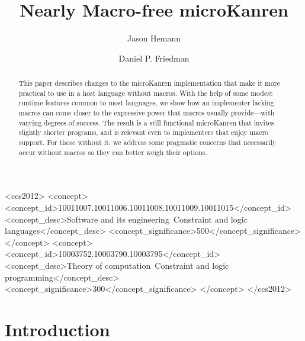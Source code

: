 \documentclass[sigplan,balance,pbalance,natbib=false]{acmart}
\begin{document}
\title{Nearly Macro-free microKanren}

\author{Jason Hemann}
\author{Daniel P. Friedman}

\renewcommand{\shortauthors}{Hemann et al.}

\begin{abstract}

  This paper describes changes to the microKanren implementation that
  make it more practical to use in a host language without macros.
  With the help of some modest runtime features common to most
  languages, we show how an implementer lacking macros can come closer
  to the expressive power that macros usually provide---with varying
  degrees of success. The result is a still functional microKanren
  that invites slightly shorter programs, and is relevant even to
  implementers that enjoy macro support. For those without it, we
  address some pragmatic concerns that necessarily occur without
  macros so they can better weigh their options.

\end{abstract}

\begin{CCSXML}
<ccs2012>
   <concept>
       <concept_id>10011007.10011006.10011008.10011009.10011015</concept_id>
       <concept_desc>Software and its engineering~Constraint and logic languages</concept_desc>
       <concept_significance>500</concept_significance>
   </concept>
   <concept>
       <concept_id>10003752.10003790.10003795</concept_id>
       <concept_desc>Theory of computation~Constraint and logic programming</concept_desc>
       <concept_significance>300</concept_significance>
   </concept>
 </ccs2012>
\end{CCSXML}



\maketitle

\section{Introduction}
\end{document}
